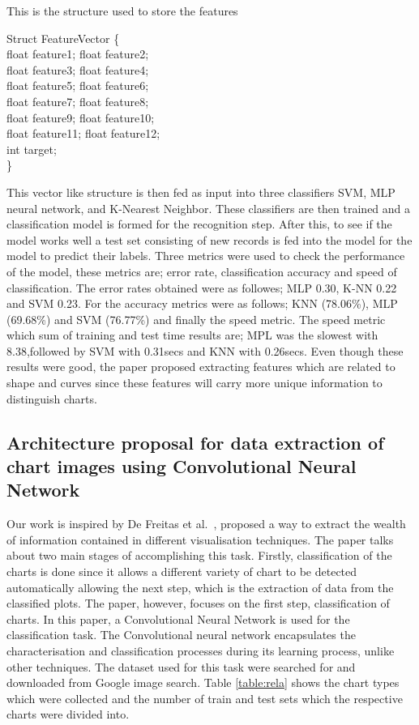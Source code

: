 \documentclass[12pt, a4paper,oneside]{report}
\begin{document}
\begin{algorithm}
\caption{This is the structure used to store the features}
\label{alg:1}
Struct FeatureVector \{\\
	float feature1; float feature2;\\
	float feature3; float feature4;\\
	float feature5; float feature6;\\
	float feature7; float feature8;\\
	float feature9; float feature10;\\
	float feature11; float feature12;\\
	int target;\\
\}
\end{algorithm}

This vector like structure is then fed as input into three classifiers SVM, MLP neural network, and K-Nearest Neighbor. These classifiers are then trained and a classification model is formed for the recognition step. After this, to see if the model works well a test set consisting of new records is fed into the model for the model to predict their labels. Three metrics were used to check the performance of the model, these metrics are; error rate,
classification accuracy and speed of classification. The error rates obtained were as followes; MLP 0.30, K-NN 0.22 and SVM 0.23. For the accuracy metrics were as follows; KNN (78.06\%), MLP (69.68\%) and SVM (76.77\%) and finally the speed metric. The speed metric which sum of training and test time results are; MPL was the slowest with 8.38,followed by SVM with 0.31secs and  KNN with 0.26secs. Even though these results were good, the paper proposed extracting features which are related to shape and curves since these features will carry more unique information to distinguish charts.

\subsection{Architecture proposal for data extraction of chart images using Convolutional Neural Network}
Our work is inspired by De Freitas et al.~\cite{junior2017archi}, proposed a way to extract the wealth of information contained in different visualisation techniques. The paper talks about two main stages of accomplishing this task. Firstly, classification of the charts is done since it allows a different variety of chart to be detected automatically allowing the next step, which is the extraction of data from the classified plots. The paper, however, focuses on the first step, classification of charts. In this paper, a Convolutional Neural Network is used for the classification task. The Convolutional neural network encapsulates the characterisation and classification processes during its learning process, unlike other techniques. The dataset used for this task were searched for and downloaded from Google image search. Table \ref{table:rela} shows the chart types which were collected and the number of train and test sets which the respective charts were divided into.
\end{document}
